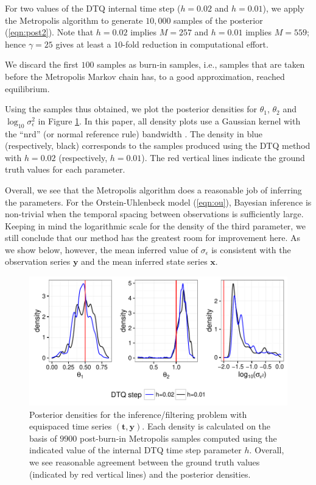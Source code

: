 \documentclass[wcp]{jmlr}
\begin{document}
For two values of the DTQ internal time step ($h = 0.02$ and
$h=0.01$), we apply the Metropolis algorithm to generate $10,000$
samples of the posterior (\ref{eqn:post2}).  Note that $h=0.02$
implies $M=257$ and $h=0.01$ implies $M=559$; hence $\gamma=25$
gives at least a $10$-fold reduction in computational effort.

We discard the first $100$ samples as burn-in samples, i.e., samples
that are taken before the Metropolis Markov chain has, to a good
approximation, reached equilibrium.

Using the samples thus obtained, we plot the posterior densities for
$\theta_1$, $\theta_2$ and $\log_{10} \sigma_\epsilon^2$ in Figure
\ref{fig:post_equi}.  In this paper, all density plots use a Gaussian
kernel with the ``nrd'' (or normal reference rule) bandwidth
\citep{Scott2015}.  The density in blue (respectively, black)
corresponds to the samples produced using the DTQ method with $h=0.02$
(respectively, $h=0.01$).  The red vertical lines indicate the ground
truth values for each parameter.

Overall, we see that the Metropolis algorithm does a reasonable job of
inferring the parameters.  For the Orstein-Uhlenbeck model
(\ref{eqn:ou}), Bayesian inference is non-trivial when the temporal
spacing between observations is sufficiently large.  Keeping in mind
the logarithmic scale for the density of the third parameter, we still
conclude that our method has the greatest room for improvement here.
As we show below, however, the mean inferred value of
$\sigma_\epsilon$ is consistent with the observation series
$\mathbf{y}$ and the mean inferred state series $\mathbf{x}$.

\begin{figure}[th]
\begin{center}
\includegraphics[width=6in]{post_equi}
\end{center}
\caption{Posterior densities for the inference/filtering problem with
  equispaced time series $(\mathbf{t},\mathbf{y})$.  Each density is
  calculated on the basis of $9900$ post-burn-in Metropolis samples
  computed  using the indicated value of the internal DTQ time step
  parameter $h$.  Overall, we see reasonable agreement between the
  ground truth values (indicated by red vertical lines) and the
  posterior densities.}
\label{fig:post_equi}
\end{figure}
\end{document}
